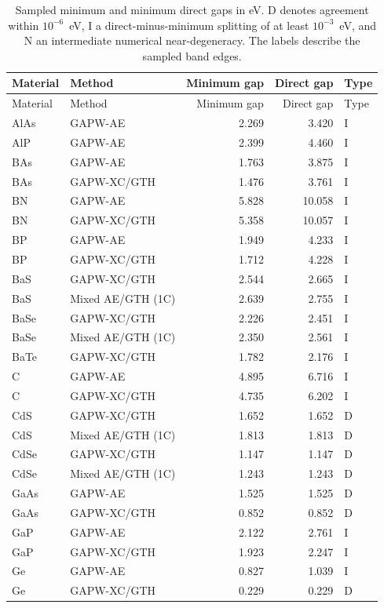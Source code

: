 \documentclass[10pt,a4paper]{article}
\begin{document}
\begin{longtable}{llrrl}
\caption{Sampled minimum and minimum direct gaps in eV. D denotes agreement within $10^{-6}$~eV, I a direct-minus-minimum splitting of at least $10^{-3}$~eV, and N an intermediate numerical near-degeneracy. The labels describe the sampled band edges.}\label{tab:bandgap-edges}\\
\toprule
Material & Method & Minimum gap & Direct gap & Type \\
\midrule
\endfirsthead
\toprule
Material & Method & Minimum gap & Direct gap & Type \\
\midrule
\endhead
\bottomrule
\endfoot
AlAs & GAPW-AE & 2.269 & 3.420 & I \\
AlP & GAPW-AE & 2.399 & 4.460 & I \\
BAs & GAPW-AE & 1.763 & 3.875 & I \\
BAs & GAPW-XC/GTH & 1.476 & 3.761 & I \\
BN & GAPW-AE & 5.828 & 10.058 & I \\
BN & GAPW-XC/GTH & 5.358 & 10.057 & I \\
BP & GAPW-AE & 1.949 & 4.233 & I \\
BP & GAPW-XC/GTH & 1.712 & 4.228 & I \\
BaS & GAPW-XC/GTH & 2.544 & 2.665 & I \\
BaS & Mixed AE/GTH (1C) & 2.639 & 2.755 & I \\
BaSe & GAPW-XC/GTH & 2.226 & 2.451 & I \\
BaSe & Mixed AE/GTH (1C) & 2.350 & 2.561 & I \\
BaTe & GAPW-XC/GTH & 1.782 & 2.176 & I \\
C & GAPW-AE & 4.895 & 6.716 & I \\
C & GAPW-XC/GTH & 4.735 & 6.202 & I \\
CdS & GAPW-XC/GTH & 1.652 & 1.652 & D \\
CdS & Mixed AE/GTH (1C) & 1.813 & 1.813 & D \\
CdSe & GAPW-XC/GTH & 1.147 & 1.147 & D \\
CdSe & Mixed AE/GTH (1C) & 1.243 & 1.243 & D \\
GaAs & GAPW-AE & 1.525 & 1.525 & D \\
GaAs & GAPW-XC/GTH & 0.852 & 0.852 & D \\
GaP & GAPW-AE & 2.122 & 2.761 & I \\
GaP & GAPW-XC/GTH & 1.923 & 2.247 & I \\
Ge & GAPW-AE & 0.827 & 1.039 & I \\
Ge & GAPW-XC/GTH & 0.229 & 0.229 & D \\

\end{longtable}
\end{document}

